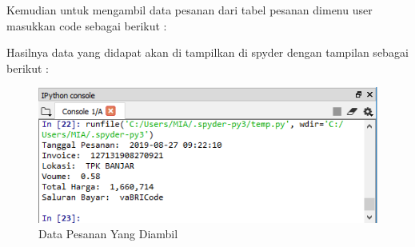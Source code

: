 Kemudian untuk mengambil data pesanan dari tabel pesanan dimenu user masukkan code sebagai berikut :


Hasilnya data yang didapat akan di tampilkan di spyder dengan tampilan sebagai berikut :
\begin{figure}[h]
	\centering
	\includegraphics[scale=0.6]{figures/mengambildatapesanan}
	\caption{Data Pesanan Yang Diambil}
\end{figure}

\newpage
